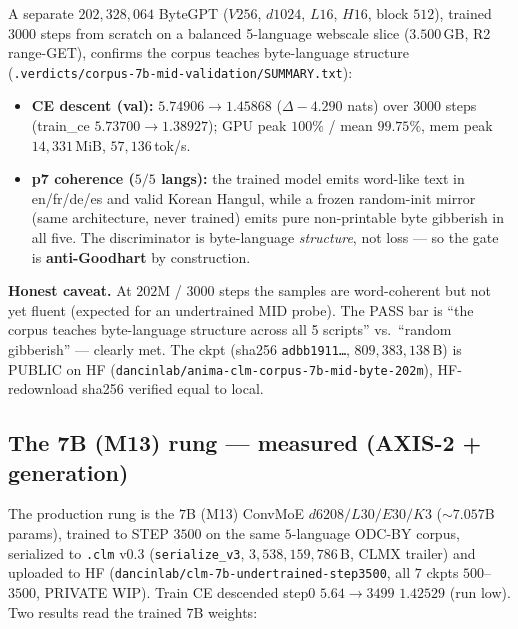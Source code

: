 A separate $202{,}328{,}064$ ByteGPT ($V256$, $d1024$, $L16$, $H16$, block
$512$), trained $3000$ steps from scratch on a balanced 5-language webscale
slice ($3.500$\,GB, R2 range-GET), confirms the corpus teaches byte-language
structure (\texttt{.verdicts/corpus-7b-mid-validation/SUMMARY.txt}):
\begin{itemize}\itemsep0.2em
\item \textbf{CE descent (val):} $5.74906\rightarrow1.45868$ ($\Delta-4.290$
nats) over $3000$ steps (train\_ce $5.73700\rightarrow1.38927$); GPU peak
$100\%$ / mean $99.75\%$, mem peak $14{,}331$\,MiB, $57{,}136$\,tok/s.
\item \textbf{p7 coherence ($5/5$ langs):} the trained model emits word-like
text in en/fr/de/es and valid Korean Hangul, while a frozen random-init mirror
(same architecture, never trained) emits pure non-printable byte gibberish in all
five. The discriminator is byte-language \emph{structure}, not loss --- so the
gate is \textbf{anti-Goodhart} by construction.
\end{itemize}
\textbf{Honest caveat.} At $202$M / $3000$ steps the samples are word-coherent but
not yet fluent (expected for an undertrained MID probe). The PASS bar is ``the
corpus teaches byte-language structure across all 5 scripts'' vs.\ ``random
gibberish'' --- clearly met. The ckpt (sha256 \texttt{adbb1911\dots},
$809{,}383{,}138$\,B) is PUBLIC on HF
(\texttt{dancinlab/anima-clm-corpus-7b-mid-byte-202m}), HF-redownload sha256
verified equal to local.

\subsection{The 7B (M13) rung --- measured (AXIS-2 + generation)}
\label{app:fm-7b}

The production rung is the $7$B (M13) ConvMoE $d6208/L30/E30/K3$ ($\sim$$7.057$B params),
trained to STEP $3500$ on the same $5$-language ODC-BY corpus, serialized to \texttt{.clm} v0.3
(\texttt{serialize\_v3}, $3{,}538{,}159{,}786$\,B, CLMX trailer) and uploaded to HF
(\texttt{dancinlab/clm-7b-undertrained-step3500}, all $7$ ckpts $500$--$3500$, PRIVATE WIP).
Train CE descended step$0$ $5.64\rightarrow3499$ $1.42529$ (run low). Two results read the
trained $7$B weights:

